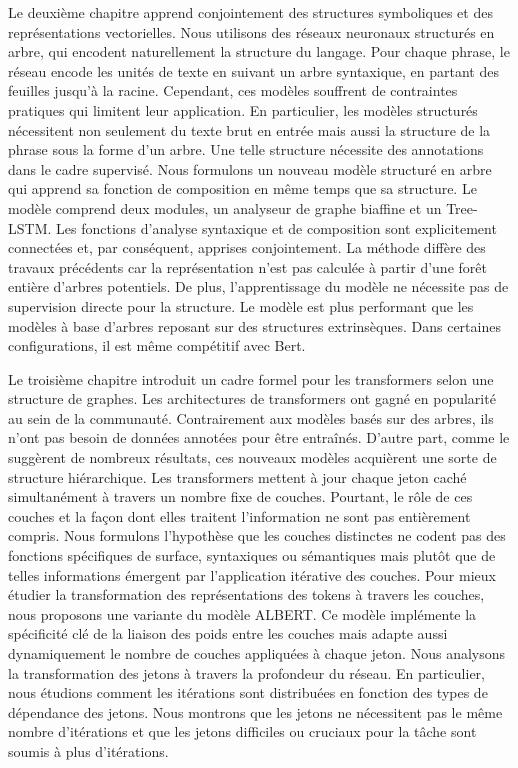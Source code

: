 Le deuxième chapitre apprend conjointement des structures symboliques et des représentations vectorielles. Nous utilisons des réseaux neuronaux structurés en arbre, qui encodent naturellement la structure du langage. Pour chaque phrase, le réseau encode les unités de texte en suivant un arbre syntaxique, en partant des feuilles jusqu'à la racine. Cependant, ces modèles souffrent de contraintes pratiques qui limitent leur application. En particulier, les modèles structurés nécessitent non seulement du texte brut en entrée mais aussi la structure de la phrase sous la forme d'un arbre. Une telle structure nécessite des annotations dans le cadre supervisé. Nous formulons un nouveau modèle structuré en arbre qui apprend sa fonction de composition en même temps que sa structure. Le modèle comprend deux modules, un analyseur de graphe biaffine et un Tree-LSTM. Les fonctions d'analyse syntaxique et de composition sont explicitement connectées et, par conséquent, apprises conjointement. La méthode diffère des travaux précédents car la représentation n'est pas calculée à partir d’une forêt entière d'arbres potentiels. De plus, l'apprentissage du modèle ne nécessite pas de supervision directe pour la structure. Le modèle est plus performant que les modèles à base d'arbres reposant sur des structures extrinsèques. Dans certaines configurations, il est même compétitif avec Bert.

Le troisième chapitre introduit un cadre formel pour les transformers selon une structure de graphes. Les architectures de transformers ont gagné en popularité au sein de la communauté. Contrairement aux modèles basés sur des arbres, ils n'ont pas besoin de données annotées pour être entraînés. D'autre part, comme le suggèrent de nombreux résultats, ces nouveaux modèles acquièrent une sorte de structure hiérarchique. Les transformers mettent à jour chaque jeton caché simultanément à travers un nombre fixe de couches. Pourtant, le rôle de ces couches et la façon dont elles traitent l'information ne sont pas entièrement compris. Nous formulons l'hypothèse que les couches distinctes ne codent pas des fonctions spécifiques de surface, syntaxiques ou sémantiques mais plutôt que de telles informations émergent par l'application itérative des couches. Pour mieux étudier la transformation des représentations des tokens à travers les couches, nous proposons une variante du modèle ALBERT. Ce modèle implémente la spécificité clé de la liaison des poids entre les couches mais adapte aussi dynamiquement le nombre de couches appliquées à chaque jeton. Nous analysons la transformation des jetons à travers la profondeur du réseau. En particulier, nous étudions comment les itérations sont distribuées en fonction des types de dépendance des jetons. Nous montrons que les jetons ne nécessitent pas le même nombre d'itérations et que les jetons difficiles ou cruciaux pour la tâche sont soumis à plus d'itérations.

